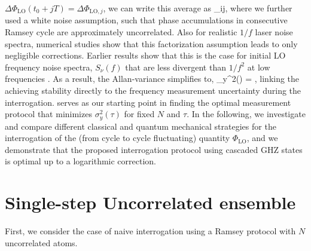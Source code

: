 $\Delta\Phi_\mathrm{LO}(t_0 + jT) = \Delta\Phi_{\mathrm{LO},j}$, we can write this
average as
\bel
	\label{eq:DeltaPhi}
	 \approx
	 \delta_{ij},
\eel
where we further used a white noise assumption, such that phase accumulations in consecutive Ramsey cycle are approximately
uncorrelated. Also for realistic $1/f$ laser noise spectra, numerical studies show that this factorization assumption leads to only negligible corrections. Earlier
results show that this is the case for initial LO frequency noise spectra,
$S_\nu(f)$ that are less divergent than $1/f^2$ at low frequencies
\cite{Andre2005}. As a result, the Allan-variance simplifies to,
\bel
\label{eq:Allan-var}
	\sigma_y^2(\tau) =  ,
\eel
linking the achieving stability directly to the frequency measurement uncertainty during the interrogation.
 serves as our starting point in finding the optimal
measurement protocol that minimizes $\sigma_y^2(\tau)$ for fixed $N$ and $\tau$. In the following, we investigate and compare different classical and quantum mechanical strategies for the interrogation of the (from cycle to cycle fluctuating) quantity $\Phi_\mathrm{LO}$, and we demonstrate that the proposed interrogation protocol using cascaded GHZ states is optimal up to a logarithmic correction.


\section{Single-step Uncorrelated ensemble}
\label{sec:P1}
First, we consider the case of naive interrogation using a Ramsey protocol with $N$
 uncorrelated  atoms. 

